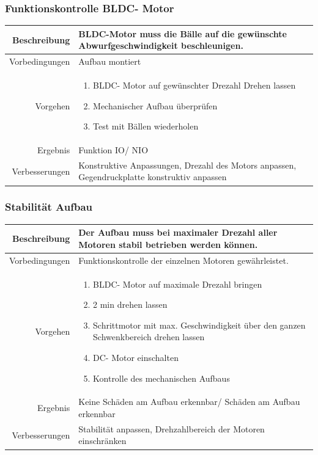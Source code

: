 \subsubsection{Funktionskontrolle BLDC- Motor}
\begin{table}[h!]
	\renewcommand{\arraystretch}{1.5}
	\begin{tabular}{|r|p{14cm}|}
		\hline Beschreibung & BLDC-Motor muss die Bälle auf die gewünschte Abwurfgeschwindigkeit beschleunigen.  \\ 
		\hline Vorbedingungen & Aufbau montiert \\ 
		\hline Vorgehen & 
		\begin{enumerate}
			\item BLDC- Motor auf gewünschter Drezahl Drehen lassen 
			\item Mechanischer Aufbau überprüfen
			\item Test mit Bällen wiederholen 
		\end{enumerate} \\ 
		\hline Ergebnis & Funktion IO/ NIO \\ 
		\hline Verbesserungen & Konstruktive Anpassungen, Drezahl des Motors anpassen, Gegendruckplatte konstruktiv anpassen \\ 
		\hline 
	\end{tabular}
\end{table}
\newpage

\subsubsection{Stabilität Aufbau}
\begin{table}[h!]
	\renewcommand{\arraystretch}{1.5}
	\begin{tabular}{|r|p{14cm}|}
		\hline Beschreibung & Der Aufbau muss bei maximaler Drezahl aller Motoren stabil betrieben werden können. \\ 
		\hline Vorbedingungen & Funktionskontrolle der einzelnen Motoren gewährleistet. \\ 
		\hline Vorgehen & 
		\begin{enumerate}
			\item BLDC- Motor auf maximale Drezahl bringen
			\item 2 min drehen lassen 
			\item Schrittmotor mit max. Geschwindigkeit über den ganzen Schwenkbereich drehen lassen  
			\item DC- Motor einschalten
			\item Kontrolle des mechanischen Aufbaus
		\end{enumerate} \\ 
		\hline Ergebnis & Keine Schäden am Aufbau erkennbar/ Schäden am Aufbau erkennbar \\ 
		\hline Verbesserungen & Stabilität anpassen, Drehzahlbereich der Motoren einschränken \\ 
		\hline 
	\end{tabular}
\end{table}

